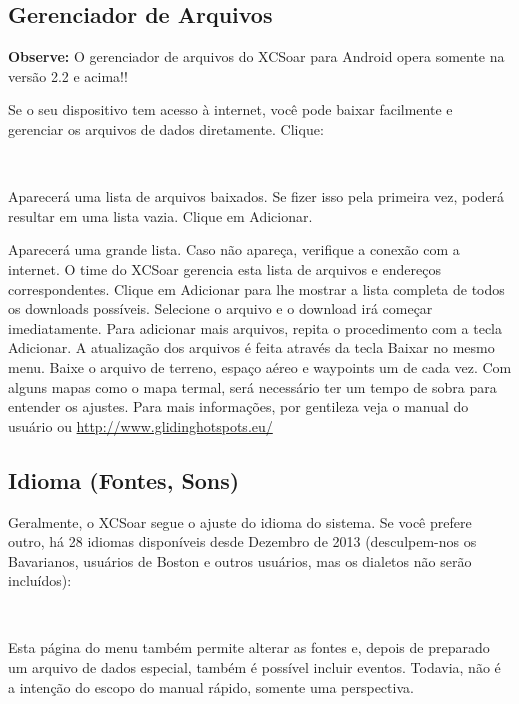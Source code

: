 \documentclass[a4paper,12pt,utf8]{scrreprt}
\newcommand{\config}[3]{\bmenut{Config}{#1/3}{\LARGE$\triangleright$}~\bmenut{#2}{#3}}%
\begin{document}
\subsection{\textcolor{flashblue}{Gerenciador de Arquivos}}
\textbf{Observe:} O gerenciador de arquivos do XCSoar para Android opera somente na versão 2.2 e acima!!

Se o seu dispositivo tem acesso à internet, você pode baixar facilmente e gerenciar os arquivos de dados diretamente.  Clique:

\begin{flushleft}\hspace*{1cm}\config{2}{File}{Manager}\\\end{flushleft}
Aparecerá uma lista de arquivos baixados.  Se fizer isso pela primeira vez, poderá resultar em uma lista vazia.  Clique em  \blink Adicionar.

Aparecerá uma grande lista.  Caso não apareça, verifique a conexão com a internet.  O time do XCSoar gerencia esta lista de arquivos e endereços correspondentes.  Clique em  \blink Adicionar para lhe mostrar a lista completa de todos os downloads possíveis.   Selecione o arquivo e o download irá começar imediatamente.  Para adicionar mais arquivos, repita o procedimento com a tecla \blink Adicionar.
A atualização dos arquivos é feita através da tecla \blink Baixar no mesmo menu.  Baixe o arquivo de terreno, espaço aéreo e waypoints um de cada vez.  Com alguns mapas como o mapa termal, será necessário ter um tempo de sobra para entender os ajustes.  Para mais informações, por gentileza veja o manual do usuário ou \url{http://www.glidinghotspots.eu/} 

\subsection{\textcolor{flashblue}{Idioma (Fontes, Sons)}}
Geralmente, o XCSoar segue o ajuste do idioma do sistema.  Se você prefere outro, há 28 idiomas disponíveis desde Dezembro de 2013 (desculpem-nos os Bavarianos, usuários de Boston e outros usuários, mas os dialetos não serão incluídos):

\begin{flushleft}\hspace*{1cm}\config{2}{Sistema}{}\blink{}\blink
{}\\\end{flushleft}

Esta página do menu também permite alterar as fontes e, depois de preparado um arquivo de dados especial, também é possível incluir eventos.  Todavia, não é a intenção do escopo do manual rápido, somente uma perspectiva. 
\end{document}
